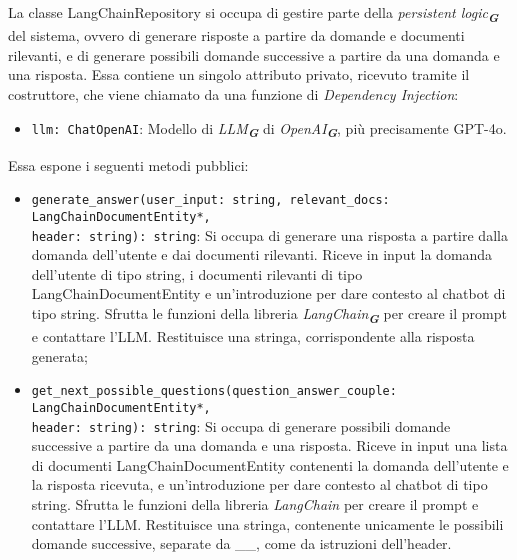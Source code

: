 \label{sec:langchain_repository}
La classe LangChainRepository si occupa di gestire parte della \emph{persistent logic}\textsubscript{\textbf{\textit{G}}} del sistema, ovvero di generare risposte a partire da domande e documenti rilevanti, e di generare possibili domande successive a partire da una domanda e una risposta. Essa contiene un singolo attributo privato, ricevuto tramite il costruttore, che viene chiamato da una funzione di \emph{Dependency Injection}:
\begin{itemize}
    \item \texttt{llm: ChatOpenAI}: Modello di \emph{LLM}\textsubscript{\textbf{\textit{G}}} di \emph{OpenAI}\textsubscript{\textbf{\textit{G}}}, più precisamente GPT-4o.
\end{itemize}
Essa espone i seguenti metodi pubblici:
\begin{itemize}
    \item \texttt{generate\_answer(user\_input: string, relevant\_docs: LangChainDocumentEntity*,\\ header: string): string}: Si occupa di generare una risposta a partire dalla domanda dell'utente e dai documenti rilevanti. Riceve in input la domanda dell'utente di tipo string, i documenti rilevanti di tipo LangChainDocumentEntity e un'introduzione per dare contesto al chatbot di tipo string. Sfrutta le funzioni della libreria \emph{LangChain}\textsubscript{\textbf{\textit{G}}} per creare il prompt e contattare l'LLM. Restituisce una stringa, corrispondente alla risposta generata;
    \item \texttt{get\_next\_possible\_questions(question\_answer\_couple: LangChainDocumentEntity*,\\ header: string): string}: Si occupa di generare possibili domande successive a partire da una domanda e una risposta. Riceve in input una lista di documenti LangChainDocumentEntity contenenti la domanda dell'utente e la risposta ricevuta, e un'introduzione per dare contesto al chatbot di tipo string. Sfrutta le funzioni della libreria \emph{LangChain} per creare il prompt e contattare l'LLM. Restituisce una stringa, contenente unicamente le possibili domande successive, separate da \_\_, come da istruzioni dell'header.
\end{itemize}

